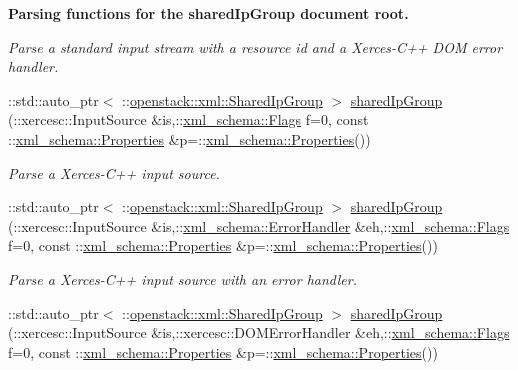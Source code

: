 \begin{Indent}{\bf Parsing functions for the sharedIpGroup document root.}
\begin{DoxyCompactItemize}
\begin{DoxyCompactList}\small\item\em Parse a standard input stream with a resource id and a Xerces-\/C++ DOM error handler. \item\end{DoxyCompactList}\item 
::std::auto\_\-ptr$<$ ::\hyperlink{classopenstack_1_1xml_1_1SharedIpGroup}{openstack::xml::SharedIpGroup} $>$ \hyperlink{namespaceopenstack_1_1xml_a501f4ae9ae49f71493f48fc8016c9ac1}{sharedIpGroup} (::xercesc::InputSource \&is,::\hyperlink{namespacexml__schema_affb4c227cbd9aa7453dd1dc5a1401943}{xml\_\-schema::Flags} f=0, const ::\hyperlink{namespacexml__schema_ad27ce19a7ee1d3b1064092648898f64c}{xml\_\-schema::Properties} \&p=::\hyperlink{namespacexml__schema_ad27ce19a7ee1d3b1064092648898f64c}{xml\_\-schema::Properties}())
\begin{DoxyCompactList}\small\item\em Parse a Xerces-\/C++ input source. \item\end{DoxyCompactList}\item 
::std::auto\_\-ptr$<$ ::\hyperlink{classopenstack_1_1xml_1_1SharedIpGroup}{openstack::xml::SharedIpGroup} $>$ \hyperlink{namespaceopenstack_1_1xml_afe21aeb0a8b708edea0eb510558e15ac}{sharedIpGroup} (::xercesc::InputSource \&is,::\hyperlink{namespacexml__schema_ab1c9361bfd3b404eaabf0c31eded79dc}{xml\_\-schema::ErrorHandler} \&eh,::\hyperlink{namespacexml__schema_affb4c227cbd9aa7453dd1dc5a1401943}{xml\_\-schema::Flags} f=0, const ::\hyperlink{namespacexml__schema_ad27ce19a7ee1d3b1064092648898f64c}{xml\_\-schema::Properties} \&p=::\hyperlink{namespacexml__schema_ad27ce19a7ee1d3b1064092648898f64c}{xml\_\-schema::Properties}())
\begin{DoxyCompactList}\small\item\em Parse a Xerces-\/C++ input source with an error handler. \item\end{DoxyCompactList}\item 
::std::auto\_\-ptr$<$ ::\hyperlink{classopenstack_1_1xml_1_1SharedIpGroup}{openstack::xml::SharedIpGroup} $>$ \hyperlink{namespaceopenstack_1_1xml_a2a2817765cfb9c68e61780736426a435}{sharedIpGroup} (::xercesc::InputSource \&is,::xercesc::DOMErrorHandler \&eh,::\hyperlink{namespacexml__schema_affb4c227cbd9aa7453dd1dc5a1401943}{xml\_\-schema::Flags} f=0, const ::\hyperlink{namespacexml__schema_ad27ce19a7ee1d3b1064092648898f64c}{xml\_\-schema::Properties} \&p=::\hyperlink{namespacexml__schema_ad27ce19a7ee1d3b1064092648898f64c}{xml\_\-schema::Properties}())

\end{DoxyCompactItemize}
\end{Indent}
